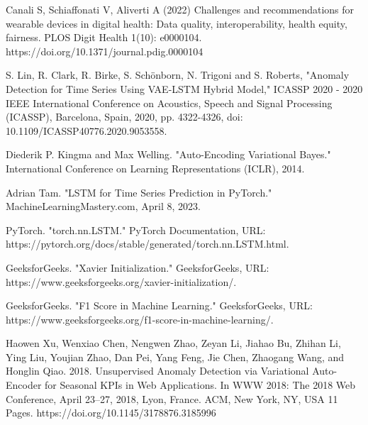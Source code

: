 \documentclass[conference]{IEEEtran}
\begin{document}
\begin{thebibliography}{1}


Canali S, Schiaffonati V, Aliverti A (2022) Challenges and recommendations for wearable devices in digital health: Data quality, interoperability, health equity, fairness. PLOS Digit Health 1(10): e0000104. https://doi.org/10.1371/journal.pdig.0000104

S. Lin, R. Clark, R. Birke, S. Schönborn, N. Trigoni and S. Roberts, "Anomaly Detection for Time Series Using VAE-LSTM Hybrid Model," ICASSP 2020 - 2020 IEEE International Conference on Acoustics, Speech and Signal Processing (ICASSP), Barcelona, Spain, 2020, pp. 4322-4326, doi: 10.1109/ICASSP40776.2020.9053558.

Diederik P. Kingma and Max Welling. "Auto-Encoding Variational Bayes." International Conference on Learning Representations (ICLR), 2014.

Adrian Tam. "LSTM for Time Series Prediction in PyTorch." MachineLearningMastery.com, April 8, 2023.

PyTorch. "torch.nn.LSTM." PyTorch Documentation, URL: https://pytorch.org/docs/stable/generated/torch.nn.LSTM.html.

GeeksforGeeks. "Xavier Initialization." GeeksforGeeks, URL: https://www.geeksforgeeks.org/xavier-initialization/.

GeeksforGeeks. "F1 Score in Machine Learning." GeeksforGeeks, URL: https://www.geeksforgeeks.org/f1-score-in-machine-learning/.

Haowen Xu, Wenxiao Chen, Nengwen Zhao, Zeyan Li, Jiahao Bu, Zhihan Li, Ying Liu, Youjian Zhao, Dan Pei, Yang Feng, Jie Chen, Zhaogang Wang, and Honglin Qiao. 2018. Unsupervised Anomaly Detection via Variational Auto-Encoder for Seasonal KPIs in Web Applications. In WWW 2018: The 2018 Web Conference, April 23–27, 2018, Lyon, France. ACM, New York, NY, USA 11 Pages. https://doi.org/10.1145/3178876.3185996

\end{thebibliography}
\end{document}
